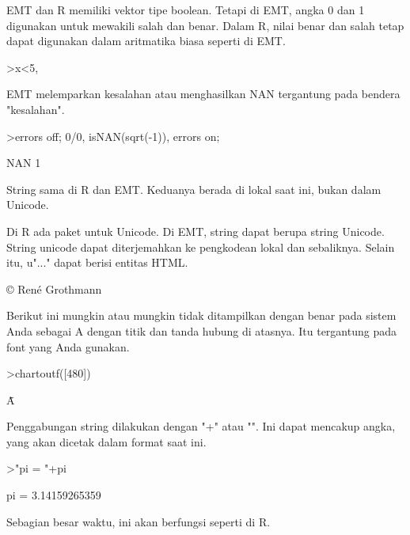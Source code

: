 \documentclass[a4paper,10pt]{article}
\begin{document}
\begin{eulernotebook}
\begin{eulercomment}
\begin{eulercomment}
\begin{eulercomment}
\begin{eulercomment}
\begin{eulercomment}
EMT dan R memiliki vektor tipe boolean. Tetapi di EMT, angka 0 dan 1
digunakan untuk mewakili salah dan benar. Dalam R, nilai benar dan
salah tetap dapat digunakan dalam aritmatika biasa seperti di EMT.
\end{eulercomment}
\begin{eulerprompt}
>x<5, %
\end{eulerprompt}
\begin{euleroutput}
  [0,  0,  1,  0,  0]
  [0,  0,  3.1,  0,  0]
\end{euleroutput}
\begin{eulercomment}
EMT melemparkan kesalahan atau menghasilkan NAN tergantung pada
bendera "kesalahan".
\end{eulercomment}
\begin{eulerprompt}
>errors off; 0/0, isNAN(sqrt(-1)), errors on;
\end{eulerprompt}
\begin{euleroutput}
  NAN
  1
\end{euleroutput}
\begin{eulercomment}
String sama di R dan EMT. Keduanya berada di lokal saat ini, bukan
dalam Unicode.

Di R ada paket untuk Unicode. Di EMT, string dapat berupa string
Unicode. String unicode dapat diterjemahkan ke pengkodean lokal dan
sebaliknya. Selain itu, u"..." dapat berisi entitas HTML.
\end{eulercomment}
\begin{euleroutput}
  © René Grothmann
\end{euleroutput}
\begin{eulercomment}
Berikut ini mungkin atau mungkin tidak ditampilkan dengan benar pada
sistem Anda sebagai A dengan titik dan tanda hubung di atasnya. Itu
tergantung pada font yang Anda gunakan.
\end{eulercomment}
\begin{eulerprompt}
>chartoutf([480])
\end{eulerprompt}
\begin{euleroutput}
  Ǡ
\end{euleroutput}
\begin{eulercomment}
Penggabungan string dilakukan dengan "+" atau "\textbar{}". Ini dapat mencakup
angka, yang akan dicetak dalam format saat ini.
\end{eulercomment}
\begin{eulerprompt}
>"pi = "+pi
\end{eulerprompt}
\begin{euleroutput}
  pi = 3.14159265359
\end{euleroutput}
\begin{eulercomment}
Sebagian besar waktu, ini akan berfungsi seperti di R.


\end{eulercomment}
\end{eulercomment}
\end{eulercomment}
\end{eulercomment}
\end{eulercomment}
\end{eulernotebook}
\end{document}
